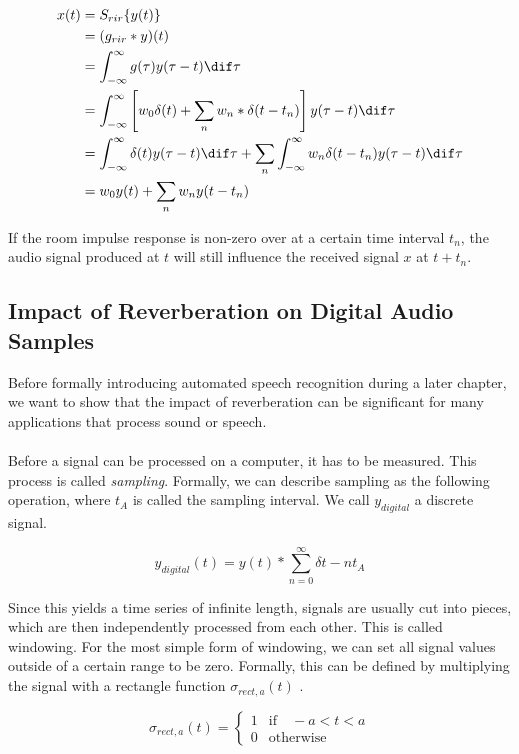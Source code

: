 \begin{align*}
x(t) &= S_{rir}\{y(t)\} \\
     &= (g_{rir} * y)(t) \\
     &= \int_{-\infty}^{\infty} g(\tau)y(\tau - t) \dif\tau \\
     &= \int_{-\infty}^{\infty} \left[ w_0 \delta(t) + \sum_{n} w_n * \delta(t - t_n)\right] y(\tau - t) \dif\tau \\
     &= \int_{-\infty}^{\infty} \delta(t) y(\tau - t) \dif\tau + \sum_{n}  \int_{-\infty}^{\infty} w_n \delta(t - t_n) y(\tau - t) \dif\tau  \\
     &= w_0 y(t) + \sum_{n} w_n y(t - t_n)
\end{align*}

If the room impulse response is non-zero over at a certain time interval $t_n$, the audio signal produced at $t$ will still influence the received signal $x$ at $t + t_n$. 

\subsection{Impact of Reverberation on Digital Audio Samples}

Before formally introducing automated speech recognition during a later chapter, we want to show that the impact of reverberation can be significant for many applications that process sound or speech.\\ \\
Before a signal can be processed on a computer, it has to be measured. This process is called \textit{sampling}. Formally, we can describe sampling as the following operation, where $t_A$ is called the sampling interval. We call $y_{digital}$ a discrete signal. 

\[
y_{digital}(t) = y(t) * \sum_{n = 0}^{\infty} \delta{t - nt_A} 
\]

Since this yields a time series of infinite length, signals are usually cut into pieces, which are then independently processed from each other. This is called windowing. For the most simple form of windowing, we can set all signal values outside of a certain range to be zero. Formally, this can be defined by multiplying the signal with a rectangle function $\sigma_{rect,a}(t)$ .

\[
\sigma_{rect,a}(t) = \begin{cases}
1 & \text{if} \quad -a < t < a \\
0 & \text{otherwise}
\end{cases}
\]

